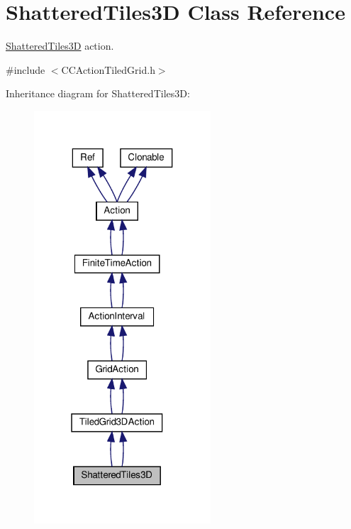 \hypertarget{classShatteredTiles3D}{}\section{Shattered\+Tiles3D Class Reference}
\label{classShatteredTiles3D}


\hyperlink{classShatteredTiles3D}{Shattered\+Tiles3D} action.  




{\ttfamily \#include $<$C\+C\+Action\+Tiled\+Grid.\+h$>$}



Inheritance diagram for Shattered\+Tiles3D\+:
\nopagebreak
\begin{figure}[H]
\begin{center}
\leavevmode
\includegraphics[width=187pt]{classShatteredTiles3D__inherit__graph}
\end{center}
\end{figure}


